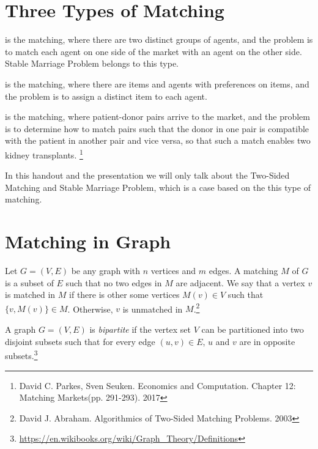 \section{Three Types of Matching}
\vspace{5mm}
\vspace{-\baselineskip}
\begin{description}[leftmargin=1em+5mm, labelindent=5mm]    
    \item [Two-Sided Matching - Definition] is the matching, where there are two distinct groups of agents, and the problem is to match each agent on one side of the market with
    an agent on the other side. Stable Marriage Problem belongs to this type. 
    \item [Assignment Problems - Definition] is the matching, where there are items and agents with preferences on items, and  the problem is to assign a distinct item to each agent.
    \item [Kidney-Paired Donation - Definition] is the matching, where patient-donor pairs arrive to the market, and the problem is to determine how to match pairs such that the donor in one pair is compatible with
    the patient in another pair and vice versa, so that such a match enables two kidney transplants.
    \footnote{David C. Parkes, Sven Seuken. Economics and Computation. Chapter 12: Matching Markets(pp. 291-293). 2017}
\end{description} 
In this handout and the presentation we will only talk about the Two-Sided Matching and Stable Marriage Problem, which is a case based on the this type of matching.

\section{Matching in Graph}
\vspace{5mm}
\vspace{-\baselineskip}
\begin{description}[leftmargin=1em+5mm, labelindent=5mm] 
    \item [Unweighted Graphs - Definition] Let $G = (V,E)$ be any graph with $n$ vertices and $m$ edges. A matching $M$ of $G$ is a subset of $E$ such that no two edges in $M$ are adjacent. 
    We say that a vertex $v$ is matched in $M$ if there is other some vertices $M(v) \in V$ such that $\{v, M(v)\} \in M$. Otherwise, $v$ is unmatched in $M$.\footnote{David J. Abraham. Algorithmics of Two-Sided Matching Problems. 2003}
    \item [Bipartite graph - Definition] A graph $G = (V,E)$ is \emph{bipartite} if the vertex set  $V$ can be partitioned into two disjoint subsets such that for every edge $(u,v)\in E$,  $u$ and $v$ are in opposite subsets.\footnote{\url{https://en.wikibooks.org/wiki/Graph_Theory/Definitions}}
\end{description}

